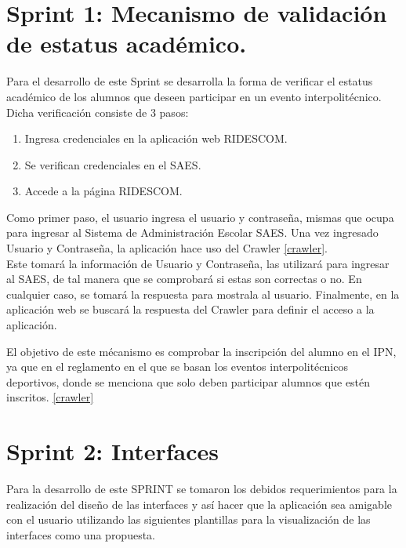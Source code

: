 	\section{Sprint 1:  Mecanismo de validación de estatus académico.}
	\noindent Para el desarrollo de este Sprint se desarrolla la forma de verificar el estatus académico de los alumnos que deseen participar en un evento interpolitécnico. \\
	Dicha verificación consiste de 3 pasos:
	\begin{enumerate}
		\item Ingresa credenciales en la aplicación web RIDESCOM.
		\item Se verifican credenciales en el SAES.
		\item Accede a la página RIDESCOM.
	\end{enumerate}
	
	Como primer paso, el usuario ingresa el usuario y contraseña, mismas que ocupa para ingresar al Sistema de Administración Escolar SAES.
	Una vez ingresado Usuario y Contraseña, la aplicación hace uso del Crawler \ref{crawler}. \\
	Este tomará la información de Usuario y Contraseña, las utilizará para ingresar al SAES, de tal manera que se comprobará si estas son correctas o no. En cualquier caso, se tomará la respuesta para mostrala al usuario.
	Finalmente, en la aplicación web se buscará la respuesta del Crawler para definir el acceso a la aplicación.
	
	El objetivo de este mécanismo es comprobar la inscripción del alumno en el IPN, ya que en el reglamento en el que se basan los eventos interpolitécnicos deportivos, donde se menciona que solo deben participar alumnos que estén inscritos. \ref{crawler}
	
	
	\section{Sprint 2: Interfaces}
	\noindent Para la desarrollo de este SPRINT se tomaron los debidos requerimientos para la realización del diseño de las interfaces y así hacer que la aplicación sea amigable con el usuario utilizando las siguientes plantillas para la visualización de las interfaces como una propuesta.
	\newline
	
